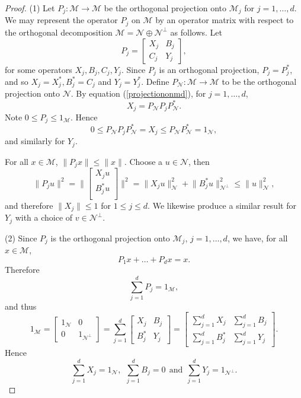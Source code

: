 \documentclass[11pt, reqno]{amsart}
\newcommand\1{\boldsymbol {1}}
\numberwithin{equation}{section}
\begin{document}
\begin{proof}
(1) Let $P_{j}:\mathcal{M}\rightarrow\mathcal{M}$ be the orthogonal projection onto $\mathcal{M}_{j}$ for $j=1,\hdots,d$. We may represent the operator $P_{j}$ on $\mathcal{M}$ by an operator matrix with respect to the orthogonal decomposition $\mathcal{M}=\mathcal{N}\oplus \mathcal{N}^{\perp}$ as follows. Let
\begin{equation}\nonumber
P_{j} =\begin{bmatrix}
    X_{j}       & B_{j} \\
    C_{j}      & Y_{j} 
\end{bmatrix},
\end{equation}
for some operators $X_{j},B_{j},C_{j},Y_{j}$. Since $P_{j}$ is an orthogonal projection, $P_{j} = P_{j}^{*}$, and so $X_{j}=X^{*}_{j}, B^{*}_{j}=C_{j}$ and $Y_{j} = Y^{*}_{j}$. Define $P_{\mathcal{N}}:\mathcal{M}\rightarrow \mathcal{M}$ to be the orthogonal projection onto $\mathcal{N}$. By equation (\ref{projectiononmd}), for $j=1,\hdots,d$,
$$X_{j} = P_{\mathcal{N}}P_{j}P_{\mathcal{N}}^{*}.$$
Note $0\leq P_{j} \leq 1_{\mathcal{M}}$. Hence
$$0\leq P_{\mathcal{N}}P_{j}P_{\mathcal{N}}^{*}=X_{j}\leq P_{\mathcal{N}}P_{\mathcal{N}}^{*} = 1_{\mathcal{N}},$$
and similarly for $Y_{j}$.

For all $x \in \mathcal{M}$, $\| P_{j}x\| \leq \| x \|$. Choose a $u\in\mathcal{N}$, then
\begin{equation}\nonumber
\| P_{j} u \|^{2} = \Bigg\| \begin{bmatrix}
    X_{j}u \\
    B^{*}_{j}u \\ 
\end{bmatrix} \Bigg\|^{2} = \big\| X_{j}u \big\|^{2}_{\mathcal{N}} + \big\| B^{*}_{j}u \big\|^{2}_{\mathcal{N}^{\perp}} \leq \| u \|^{2}_{\mathcal{N}},
\end{equation}
and therefore $\| X_{j}\| \leq 1$ for $1\leq j \leq d$. We likewise produce a similar result for $Y_{j}$ with a choice of $v\in\mathcal{N}^{\perp}$.

 (2) Since $P_{j}$ is the orthogonal projection onto $\mathcal{M}_{j}$, $j=1,\hdots,d$, we have, for all $x\in\mathcal{M}$,
$$P_{1}x + \hdots + P_{d}x = x.$$	
Therefore
$$ \sum_{j=1}^{d} P_{j} = 1_{\mathcal{M}},$$
and thus
$$ 1_{\mathcal{M}} = \begin{bmatrix}
	1_{\mathcal{N}} & 0 \\
	0 & 1_{\mathcal{N}^{\perp}}
\end{bmatrix} = \sum_{j=1}^{d} \begin{bmatrix}
X_{j} & B_{j} \\
B^{*}_{j} & Y_{j}
\end{bmatrix} = \begin{bmatrix}
\sum_{j=1}^{d} X_{j} & \sum_{j=1}^{d} B_{j} \\
\sum_{j=1}^{d} B^{*}_{j} & \sum_{j=1}^{d} Y_{j}
\end{bmatrix}. $$
Hence
$$ \sum_{j=1}^{d} X_{j} = 1_{\mathcal{N}}, ~~\sum_{j=1}^{d} B_{j}  = 0 ~~\text{and}~~\sum_{j=1}^{d} Y_{j}  = 1_{\mathcal{N}^{\perp}}.$$


\end{proof}
\end{document}
